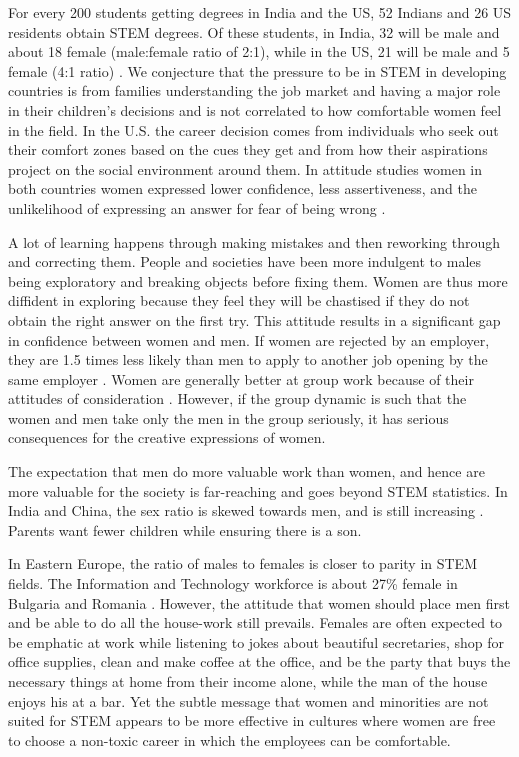 \documentclass[utf8]{frontiersSCNS} %
\begin{document}

For every 200 students getting degrees in India and the US, 52 Indians and 26 US residents obtain STEM degrees. Of these students, in India, 32 will be male and about 18 female (male:female ratio of 2:1), while in the US, 21 will be male and 5 female (4:1 ratio) \citep{STEMDegreesByCountry}. We conjecture that the pressure to be in STEM in developing countries is from families understanding the job market and having a major role in their children’s decisions and is not correlated to how comfortable women feel in the field. In the U.S. the career decision comes from individuals who seek out their comfort zones based on the cues they get and from how their aspirations project on the social environment around them.  In attitude studies women in both countries women expressed lower confidence, less assertiveness, and the unlikelihood of expressing an answer for fear of being wrong \citep{Yardi}. 

A lot of learning happens through making mistakes and then reworking through and correcting them. People and societies have been more indulgent to males being exploratory and breaking objects before fixing them.  Women are thus more diffident in exploring because they feel they will be chastised if they do not obtain the right answer on the first try. This attitude results in a significant gap in confidence between women and men. If women are rejected by an employer, they are 1.5 times less likely than men to apply to another job opening by the same employer \citep{brands2017leaning}. Women are generally better at group work because of their attitudes of consideration \citep{Yardi}. However, if the group dynamic is such that the women and men take only the men in the group seriously, it has serious consequences for the creative expressions of women.

The expectation that men do more valuable work than women, and hence are more valuable for the society is far-reaching and goes beyond STEM statistics. In India and China, the sex ratio is skewed towards men, and is still increasing \citep{YouthIndia,hesketh2011consequences}. Parents want fewer children while ensuring there is a son. 

In Eastern Europe, the ratio of males to females is closer to parity in STEM fields. The Information and Technology workforce is about 27\% female in Bulgaria and Romania \citep{Eurostat}.  However, the attitude that women should place men first and be able to do all the house-work still prevails. Females are often expected to be emphatic at work while listening to jokes about beautiful secretaries, shop for office supplies, clean and make coffee at the office, and be the party that buys the necessary things at home from their income alone, while the man of the house enjoys his at a bar. Yet the subtle message that women and minorities are not suited for STEM appears to be more effective in cultures where women are free to choose a non-toxic career in which the employees can be comfortable. 
\end{document}
